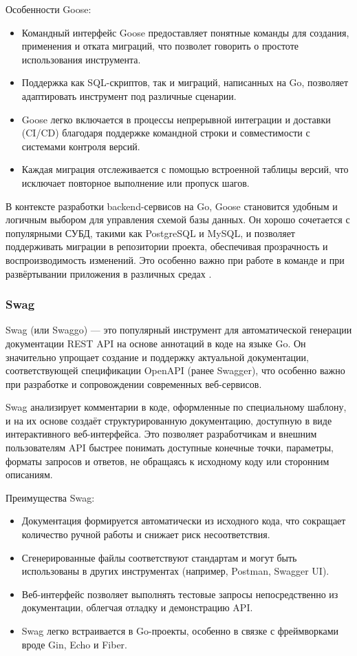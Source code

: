 \documentclass[diploma]{SCWorks}
\begin{document}
Особенности Goose:
\begin{itemize}
    \item Командный интерфейс Goose 
    предоставляет понятные команды для создания, применения и отката миграций, 
    что позволет говорить о простоте использования инструмента.
    \item Поддержка как SQL-скриптов, так и миграций, написанных на Go, 
    позволяет адаптировать инструмент под различные сценарии.
    \item Goose легко включается в процессы непрерывной интеграции и 
    доставки (CI/CD) благодаря поддержке командной строки и совместимости с 
    системами контроля версий.
    \item Каждая миграция отслеживается с помощью встроенной таблицы 
    версий, что исключает повторное выполнение или пропуск шагов.
\end{itemize}

В контексте разработки backend-сервисов на Go, Goose становится удобным и 
логичным выбором для управления схемой базы данных. Он хорошо сочетается с 
популярными СУБД, такими как PostgreSQL и MySQL, и позволяет поддерживать 
миграции в репозитории проекта, обеспечивая прозрачность и воспроизводимость 
изменений. Это особенно важно при работе в команде и при развёртывании 
приложения в различных средах \cite{goose}.

\subsubsection{Swag}

Swag (или Swaggo) — это популярный инструмент для автоматической генерации 
документации REST API на основе аннотаций в коде на языке Go. Он значительно 
упрощает создание и поддержку актуальной документации, соответствующей 
спецификации OpenAPI (ранее Swagger), что особенно важно при разработке и 
сопровождении современных веб-сервисов.

Swag анализирует комментарии в коде, оформленные по специальному шаблону, и на 
их основе создаёт структурированную документацию, доступную в виде 
интерактивного веб-интерфейса. Это позволяет разработчикам и внешним 
пользователям API быстрее понимать доступные конечные точки, параметры, 
форматы запросов и ответов, не обращаясь к исходному коду или сторонним 
описаниям.

Преимущества Swag:
\begin{itemize}
    \item Документация формируется автоматически из исходного кода, что 
    сокращает количество ручной работы и снижает риск несоответствия.
    \item Сгенерированные файлы соответствуют стандартам и могут быть 
    использованы в других инструментах (например, Postman, Swagger UI).
    \item Веб-интерфейс позволяет выполнять тестовые запросы непосредственно 
    из документации, облегчая отладку и демонстрацию API.
    \item Swag легко встраивается в Go-проекты, особенно в связке с 
    фреймворками вроде Gin, Echo и Fiber.
\end{itemize}
\end{document}
